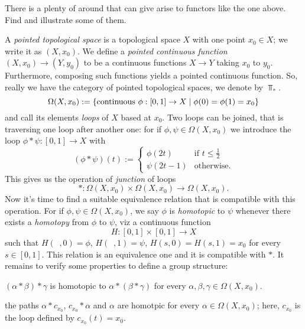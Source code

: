 \begin{exercise}
  There is a plenty of  around that can give arise to
  functors like the one above. Find and illustrate some of them.
\end{exercise}

\begin{example}
  A {\em pointed topological space} is a topological space \(X\) with
  one point \(x_0 \in X\); we write it as \((X, x_0)\). We define a {\em
    pointed continuous function} \((X, x_0) \to (Y, y_0)\) to be a
  continuous functions \(X \to Y\) taking \(x_0\) to
  \(y_0\). Furthermore, composing such functions yields a pointed
  continuous function. So, really we have the category of pointed
  topological spaces, we denote by \(\Top_\ast\).
  \[\Omega(X, x_0) := \left\{\text{continuous } \phi : [0,1] \to X \mid
      \phi(0) = \phi(1) = x_0\right\}\] and call its elements {\em loops} of
  \(X\) based at \(x_0\).  Two loops can be joined, that is traversing
  one loop after another one: for if \(\phi, \psi \in \Omega(X, x_0)\)
  we introduce the loop \(\phi \ast \psi : [0,1] \to X\) with
  \[(\phi \ast \psi) (t) := \begin{cases} \phi(2t) & \text{if } t \le \frac12 \\
    \psi(2t-1) & \text{otherwise.} \end{cases}\] This gives us the
  operation of {\em junction} of loops
  \[\ast : \Omega(X, x_0) \times \Omega(X, x_0) \to \Omega(X, x_0) .\]
  Now it's time to find a suitable equivalence relation that is
  compatible with this operation. For if
  \(\phi, \psi \in \Omega(X, x_0)\), we say \(\phi\) is {\em
    homotopic} to \(\psi\) whenever there exists a {\em homotopy} from
  \(\phi\) to \(\psi\), viz a continuous function
  \[H : [0,1] \times [0,1] \to X\] such that
  \(H(\phantom{s}, 0) = \phi\), \(H(\phantom{s}, 1) = \psi\),
  \(H(s, 0) = H(s, 1) = x_0\) for every \(s \in [0, 1]\). This
  relation is an equivalence one and it is compatible with
  \(\ast\). It remains to verify some properties to define a group
  structure:
  \begin{tcbitem}
  \item \((\alpha \ast \beta) \ast \gamma\) is homotopic to
    \(\alpha \ast (\beta \ast \gamma)\) for every
    \(\alpha, \beta, \gamma \in \Omega(X, x_0)\).
  \item the paths \(\alpha \ast c_{x_0}\), \(c_{x_0} \ast \alpha\) and
    \(\alpha\) are homotpic for every \(\alpha \in \Omega(X, x_0)\);
    here, \(c_{x_0}\) is the loop defined by \(c_{x_0}(t) = x_0\).

\end{tcbitem}
\end{example}
